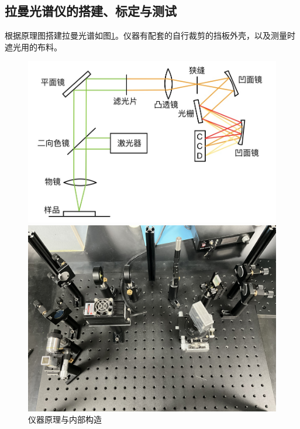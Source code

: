\documentclass[UTF8]{article}
\begin{document}
	\subsection{拉曼光谱仪的搭建、标定与测试}
	根据原理图搭建拉曼光谱如图\ref{instrument}。仪器有配套的自行裁剪的挡板外壳，以及测量时遮光用的布料。
	\begin{figure}[htp]
		\begin{minipage}[t]{0.5\textwidth}
			\centering
			\includegraphics[width=\linewidth]{figures/construction.png} 
		\end{minipage}
		\begin{minipage}[t]{0.5\textwidth}
			\centering
			\includegraphics[width=\textwidth]{figures/IMG_0008.JPG}
		\end{minipage}
		\caption{仪器原理与内部构造} \label{instrument}
	\end{figure}
\end{document}
